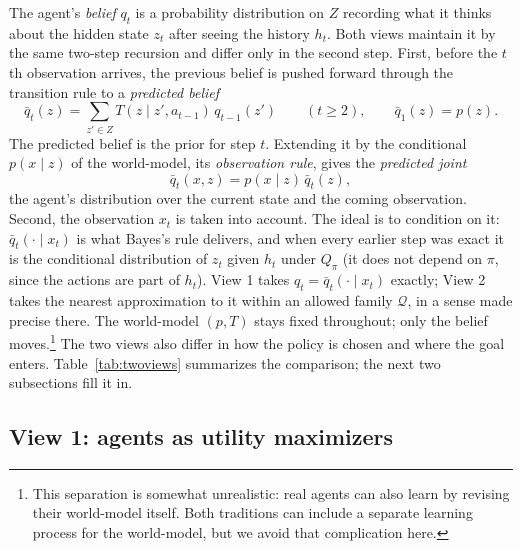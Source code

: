 The agent's \emph{belief} $q_t$ is a probability distribution on $Z$ recording what it thinks about the hidden state $z_t$ after seeing the history $h_t$. Both views maintain it by the same two-step recursion and differ only in the second step. First, before the $t$th observation arrives, the previous belief is pushed forward through the transition rule to a \emph{predicted belief}
\[
   \bar q_t(z)=\sum_{z'\in Z} T(z\mid z',a_{t-1})\,q_{t-1}(z')\qquad(t\ge2),\qquad \bar q_1(z)=p(z).
\]
The predicted belief is the prior for step $t$. Extending it by the conditional $p(x\mid z)$ of the world-model, its \emph{observation rule}, gives the \emph{predicted joint}
\begin{equation}\label{eq:predicted-joint}
   \bar q_t(x,z)=p(x\mid z)\,\bar q_t(z),
\end{equation}
the agent's distribution over the current state and the coming observation. Second, the observation $x_t$ is taken into account. The ideal is to condition on it: $\bar q_t(\cdot\mid x_t)$ is what Bayes's rule delivers, and when every earlier step was exact it is the conditional distribution of $z_t$ given $h_t$ under $Q_\pi$ (it does not depend on $\pi$, since the actions are part of $h_t$). View 1 takes $q_t=\bar q_t(\cdot\mid x_t)$ exactly; View 2 takes the nearest approximation to it within an allowed family $\mathcal Q$, in a sense made precise there. The world-model $(p,T)$ stays fixed throughout; only the belief moves.\footnote{This separation is somewhat unrealistic: real agents can also learn by revising their world-model itself. Both traditions can include a separate learning process for the world-model, but we avoid that complication here.} The two views also differ in how the policy is chosen and where the goal enters. Table~\ref{tab:twoviews} summarizes the comparison; the next two subsections fill it in.


\subsection{View 1: agents as utility maximizers}

